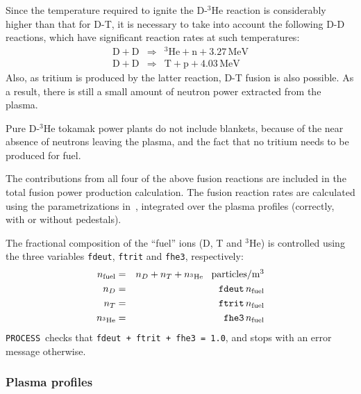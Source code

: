 \documentclass[11pt,a4paper]{report}
\newcommand{\process}{\mbox{\texttt{PROCESS}}}
\begin{document}
Since the temperature required to ignite the D-$^3$He reaction is considerably
higher than that for D-T, it is necessary to take into account the following
D-D reactions, which have significant reaction rates at such temperatures:
\begin{eqnarray}
\mathrm{D + D} & \Longrightarrow & \mathrm{^{3}He + n + 3.27 \,MeV} \\
\mathrm{D + D} & \Longrightarrow & \mathrm{T + p + 4.03 \,MeV}
\end{eqnarray}
Also, as tritium is produced by the latter reaction, D-T fusion is also
possible. As a result, there is still a small amount of neutron power
extracted from the plasma.

Pure D-$^3$He tokamak power plants do not include blankets, because of the near
absence of neutrons leaving the plasma, and the fact that no tritium needs to
be produced for fuel.

The contributions from all four of the above fusion reactions are included in
the total fusion power production calculation. The fusion reaction rates are
calculated using the parametrizations in~\cite{BoschHale}, integrated over the
plasma profiles (correctly, with or without pedestals).

The fractional composition of the ``fuel'' ions (D, T and $^3$He) is
controlled using the three variables \texttt{fdeut}, \texttt{ftrit} and
\texttt{fhe3}, respectively:
\begin{eqnarray*}
n_{\mbox{\scriptsize fuel}} & = & n_D + n_T + n_{\mathrm{^{3}He}}  \;\;\; \mbox{particles/m$^3$} \\
n_D & = & \mathtt{fdeut} \, n_{\mbox{\scriptsize fuel}} \\
n_T & = & \mathtt{ftrit} \, n_{\mbox{\scriptsize fuel}} \\
n_{\mathrm{^{3}He}} & = & \mathtt{fhe3} \, n_{\mbox{\scriptsize fuel}}
\end{eqnarray*}
\process\ checks that \texttt{fdeut + ftrit + fhe3 = 1.0}, and stops with an
error message otherwise.

\subsubsection{Plasma profiles}
\end{document}
